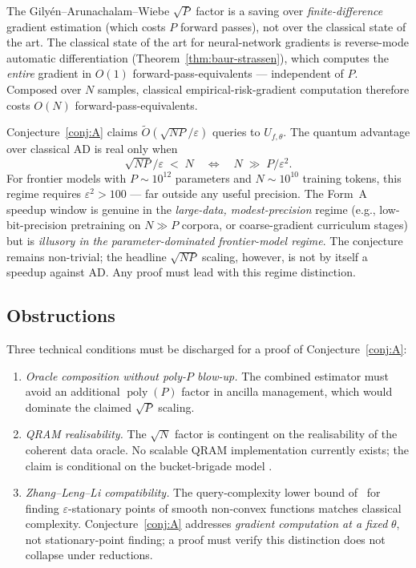 \documentclass[11pt,a4paper]{article}
\theoremstyle{definition}
\DeclareMathOperator*{\poly}{poly}
\newcommand{\Otil}{\widetilde{O}}
\newcommand{\veps}{\varepsilon}
\begin{document}
The Gily\'{e}n--Arunachalam--Wiebe $\sqrt{P}$ factor is a saving over \emph{finite-difference} gradient estimation (which costs $P$ forward passes), not over the classical state of the art. The classical state of the art for neural-network gradients is reverse-mode automatic differentiation (Theorem~\ref{thm:baur-strassen}), which computes the \emph{entire} gradient in $O(1)$ forward-pass-equivalents --- independent of $P$. Composed over $N$ samples, classical empirical-risk-gradient computation therefore costs $O(N)$ forward-pass-equivalents.

Conjecture~\ref{conj:A} claims $\Otil(\sqrt{NP}/\veps)$ queries to $U_{f,\theta}$. The quantum advantage over classical AD is real only when
\[
\sqrt{NP}/\veps \;<\; N \quad\Longleftrightarrow\quad N \;\gg\; P/\veps^{2}.
\]
For frontier models with $P \sim 10^{12}$ parameters and $N \sim 10^{10}$ training tokens, this regime requires $\veps^{2} > 100$ --- far outside any useful precision. The Form~A speedup window is genuine in the \emph{large-data, modest-precision} regime (e.g., low-bit-precision pretraining on $N \gg P$ corpora, or coarse-gradient curriculum stages) but is \emph{illusory in the parameter-dominated frontier-model regime}. The conjecture remains non-trivial; the headline $\sqrt{NP}$ scaling, however, is not by itself a speedup against AD. Any proof must lead with this regime distinction.

\subsection{Obstructions}

Three technical conditions must be discharged for a proof of Conjecture~\ref{conj:A}:
\begin{enumerate}[label=(O\arabic*),itemsep=0pt]
\item \emph{Oracle composition without poly-$P$ blow-up.} The combined estimator must avoid an additional $\poly(P)$ factor in ancilla management, which would dominate the claimed $\sqrt{P}$ scaling.
\item \emph{QRAM realisability.} The $\sqrt{N}$ factor is contingent on the realisability of the coherent data oracle. No scalable QRAM implementation currently exists; the claim is conditional on the bucket-brigade model \cite{GLM2008}.
\item \emph{Zhang--Leng--Li compatibility.} The query-complexity lower bound of~\cite{ZhangLengLi2023} for finding $\veps$-stationary points of smooth non-convex functions matches classical complexity. Conjecture~\ref{conj:A} addresses \emph{gradient computation at a fixed} $\theta$, not stationary-point finding; a proof must verify this distinction does not collapse under reductions.
\end{enumerate}
\end{document}
